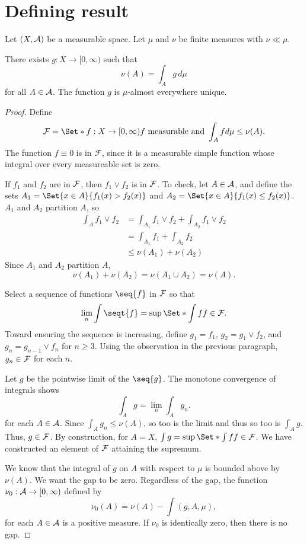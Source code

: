 
\section*{Defining result}

\begin{proposition}
Let $(X, \mathcal{A})$ be a measurable space.
Let $\mu $ and $\nu $ be finite measures with $\nu  \ll \mu $.

There exists $g: X \to [0, \infty)$ such that
  \[
\nu (A) = \int_A g \, d\mu
  \]
for all $A \in \mathcal{A}$.
The function $g$ is $\mu $-almost everywhere unique.
\begin{proof}
Define
  \[
\SF = \Set*{
f: X \to [0, \infty)
}{
f \text{ measurable and }
\int_A f d\mu  \leq \nu (A)
}.
  \]
The function $f \equiv 0$ is in $\mathcal{F} $, since it is a measurable simple function whose integral over every measureable set is zero.

If $f_1$ and $f_2$ are in $\mathcal{F}$, then $f_1 \vee f_2$ is in $\mathcal{F}$.
To check, let $A \in \mathcal{A}$, and define the sets $A_1 = \Set{x \in A}{f_1(x) > f_2(x)}$ and $A_2 = \Set{x \in A}{f_1(x) \leq f_2(x)}$.
$A_1$ and $A_2$ partition $A$, so
  \[
\begin{aligned}
\int_A f_1 \vee f_2
&= \int_{A_1} f_1 \vee f_2 + \int_{A_2} f_1 \vee f_2 \\
&= \int_{A_1} f_1 + \int_{A_2} f_2 \\
&\leq \nu (A_1) + \nu (A_2)
\end{aligned}
  \]
Since $A_1$ and $A_2$ partition $A$,
    \[
\nu (A_1) + \nu (A_2) =
\nu (A_1 \cup A_2) =
\nu (A).
    \]

Select a sequence of
functions $\seq{f}$ in $\mathcal{F}$
so that
\[
\lim_{n} \int \seqt{f} =
\sup\Set*{\int f}{f \in \SF}.
\]
Toward ensuring the sequence
is increasing, define
$g_1 = f_1$, $g_2 = g_1 \vee f_2$,
and $g_n = g_{n-1} \vee f_n$
for $n \geq 3$.
Using the observation in the previous
paragraph, $g_n \in \mathcal{F}$ for each $n$.

Let $g$ be the pointwise limit
of the $\seq{g}$.
The monotone convergence of integrals shows
  \[
\int_A g = \lim_n \int_A g_n.
  \]
for each $A \in \mathcal{A}$.
Since $\int_A g_n \leq \nu (A)$,
so too is the limit and thus
so too is $\int_A g$.
Thus, $g \in \mathcal{F}$.
By construction,
for $A = X$,
$\int g = \sup\Set*{\int f}{f \in \SF}$.
We have constructed an element of $\mathcal{F}$
attaining the supremum.

We know that the integral of
$g$ on $A$ with respect to $\mu $
is bounded above by $\nu (A)$.
We want the gap to be zero.
Regardless of the gap, the function $\nu _0: \mathcal{A} \to [0, \infty)$ defined by
  \[
\nu _0(A) = \nu (A) - \int(g, A, \mu ),
  \]
for each $A \in \mathcal{A}$ is a positive measure.
If $\nu _0$ is identically zero, then there is no gap.


\end{proof}
\end{proposition}
